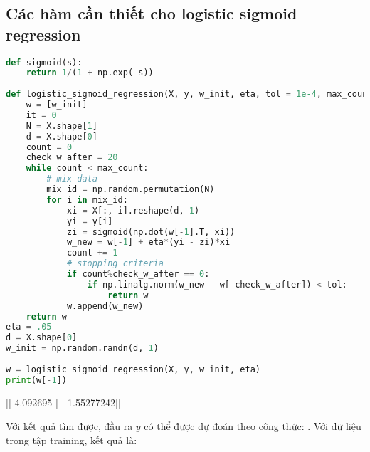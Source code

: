  
\subsection{Các hàm cần thiết cho logistic sigmoid regression}
 
 
\begin{lstlisting}[language=Python]
def sigmoid(s): 
    return 1/(1 + np.exp(-s)) 
 
def logistic_sigmoid_regression(X, y, w_init, eta, tol = 1e-4, max_count = 10000): 
    w = [w_init]     
    it = 0 
    N = X.shape[1] 
    d = X.shape[0] 
    count = 0 
    check_w_after = 20 
    while count < max_count: 
        # mix data  
        mix_id = np.random.permutation(N) 
        for i in mix_id: 
            xi = X[:, i].reshape(d, 1) 
            yi = y[i] 
            zi = sigmoid(np.dot(w[-1].T, xi)) 
            w_new = w[-1] + eta*(yi - zi)*xi 
            count += 1 
            # stopping criteria 
            if count%check_w_after == 0:                 
                if np.linalg.norm(w_new - w[-check_w_after]) < tol: 
                    return w 
            w.append(w_new) 
    return w 
eta = .05  
d = X.shape[0] 
w_init = np.random.randn(d, 1) 
 
w = logistic_sigmoid_regression(X, y, w_init, eta) 
print(w[-1]) 
\end{lstlisting}
 
    [[-4.092695  ] 
     [ 1.55277242]] 
 
 
Với kết quả tìm được, đầu ra $y$ có thể được dự đoán theo công thức: . Với dữ liệu trong tập training, kết quả là: 
 
